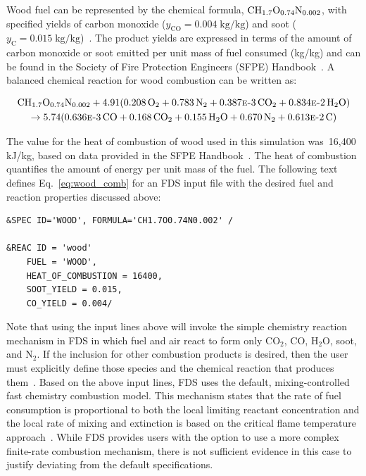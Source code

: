 Wood fuel can be represented by the chemical formula, $\mbox{C}\mbox{H}_{1.7}\mbox{O}_{0.74}\mbox{N}_{0.002}$, with specified yields of carbon monoxide ($y_{\mathrm{CO}}=0.004 \; \mathrm{kg}/\mathrm{kg}$) and soot ($y_{\mathrm{C}}=0.015 \; \mathrm{kg}/\mathrm{kg}$)~\cite{SFPE:Tewarson}. The product yields are expressed in terms of the amount of carbon monoxide or soot emitted per unit mass of fuel consumed (kg/kg) and can be found in the Society of Fire Protection Engineers (SFPE) Handbook~\cite{SFPE:Tewarson}. A balanced chemical reaction for wood combustion can be written as:

\begin{multline}
\mbox{C}\mbox{H}_{1.7}\mbox{O}_{0.74}\mbox{N}_{0.002} + 4.91(0.208\,\mbox{O}_{2} + 0.783\,\mbox{N}_{2} + 0.387\text{\sc{e}-}3\,\mbox{C}\mbox{O}_{2} + 0.834\text{\sc{e}-}2\,\mbox{H}_{2}\mbox{O}) \\ 
\rightarrow 5.74(0.636\text{\sc{e}-}3\,\mbox{C}\mbox{O} + 0.168\,\mbox{C}\mbox{O}_{2} + 0.155\,\mbox{H}_{2}\mbox{O} + 0.670\,\mbox{N}_{2} + 0.613\text{\sc{e}-}2\,\mbox{C})
\label{eq:wood_comb}
\end{multline}

The value for the heat of combustion of wood used in this simulation was~16,400 kJ/kg, based on data provided in the SFPE Handbook~\cite{SFPE:Tewarson}. The heat of combustion quantifies the amount of energy per unit mass of the fuel. The following text defines Eq.~\ref{eq:wood_comb} for an FDS input file with the desired fuel and reaction properties discussed above:

\begin{lstlisting}
&SPEC ID='WOOD', FORMULA='CH1.7O0.74N0.002' /

&REAC ID = 'wood' 
    FUEL = 'WOOD', 
    HEAT_OF_COMBUSTION = 16400,
    SOOT_YIELD = 0.015,
    CO_YIELD = 0.004/
\end{lstlisting}

Note that using the input lines above will invoke the simple chemistry reaction mechanism in FDS in which fuel and air react to form only CO$_2$, CO, H$_2$O, soot, and N$_2$. If the inclusion for other combustion products is desired, then the user must explicitly define those species and the chemical reaction that produces them~\cite{FDS_Users_Guide}. Based on the above input lines, FDS uses the default, mixing-controlled fast chemistry combustion model. This mechanism states that the rate of fuel consumption is proportional to both the local limiting reactant concentration and the local rate of mixing and extinction is based on the critical flame temperature approach~\cite{FDS_Math_Guide}. While FDS provides users with the option to use a more complex finite-rate combustion mechanism, there is not sufficient evidence in this case to justify deviating from the default specifications. 

